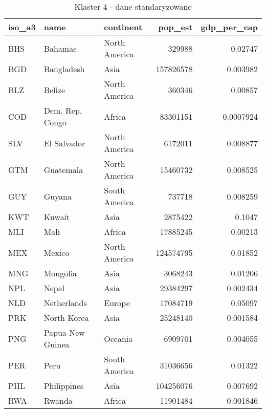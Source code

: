 \begin{table}[h!]
    \centering
    \caption{Klaster 4 - dane standaryzowane}
    \label{tab:cl4std}
    \begin{tabular}{lllrr}
        \toprule
        iso\_a3 & name                & continent     & pop\_est  & gdp\_per\_cap \\
        \midrule
        BHS     & Bahamas             & North America & 329988    & 0.02747       \\
        BGD     & Bangladesh          & Asia          & 157826578 & 0.003982      \\
        BLZ     & Belize              & North America & 360346    & 0.00857       \\
        COD     & Dem. Rep. Congo     & Africa        & 83301151  & 0.0007924     \\
        SLV     & El Salvador         & North America & 6172011   & 0.008877      \\
        GTM     & Guatemala           & North America & 15460732  & 0.008525      \\
        GUY     & Guyana              & South America & 737718    & 0.008259      \\
        KWT     & Kuwait              & Asia          & 2875422   & 0.1047        \\
        MLI     & Mali                & Africa        & 17885245  & 0.00213       \\
        MEX     & Mexico              & North America & 124574795 & 0.01852       \\
        MNG     & Mongolia            & Asia          & 3068243   & 0.01206       \\
        NPL     & Nepal               & Asia          & 29384297  & 0.002434      \\
        NLD     & Netherlands         & Europe        & 17084719  & 0.05097       \\
        PRK     & North Korea         & Asia          & 25248140  & 0.001584      \\
        PNG     & Papua New Guinea    & Oceania       & 6909701   & 0.004055      \\
        PER     & Peru                & South America & 31036656  & 0.01322       \\
        PHL     & Philippines         & Asia          & 104256076 & 0.007692      \\
        RWA     & Rwanda              & Africa        & 11901484  & 0.001846      \\

\end{tabular}
\end{table}
